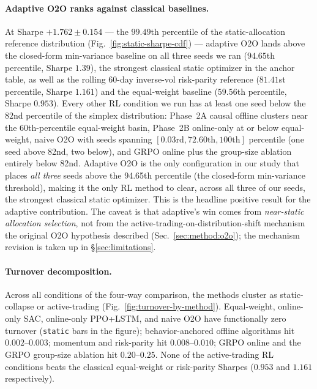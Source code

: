 \paragraph{Adaptive O2O ranks against classical baselines.} At Sharpe
$+1.762 \pm 0.154$ --- the $99.49$th percentile of the static-allocation
reference distribution (Fig.~\ref{fig:static-sharpe-cdf}) --- adaptive
O2O lands above the closed-form min-variance baseline on all three
seeds we ran ($94.65$th percentile, Sharpe $1.39$), the strongest classical static
optimizer in the anchor table, as well as the rolling 60-day
inverse-vol risk-parity reference ($81.41$st percentile, Sharpe $1.161$)
and the equal-weight baseline ($59.56$th percentile, Sharpe $0.953$).
Every other RL condition we run has at least one seed below the
$82$nd percentile of the simplex distribution: Phase~2A causal offline
clusters near the 60th-percentile equal-weight basin, Phase~2B
online-only at or below equal-weight, naive O2O with seeds spanning
$[0.03\text{rd}, 72.60\text{th}, 100\text{th}]$ percentile (one seed
above 82nd, two below), and GRPO online plus the group-size ablation
entirely below 82nd. Adaptive O2O is the only configuration in our
study that places \emph{all three} seeds above the 94.65th percentile
(the closed-form min-variance threshold), making it the only RL method
to clear, across all three of our seeds, the strongest classical static optimizer. This is the headline positive result for the adaptive
contribution.
The caveat is that adaptive's win comes from \emph{near-static
allocation selection}, not from the active-trading-on-distribution-shift
mechanism the original O2O hypothesis described
(Sec.~\ref{sec:method:o2o}); the mechanism revision is taken up in
\S\ref{sec:limitations}.

\paragraph{Turnover decomposition.} Across all conditions of the
four-way comparison, the methods cluster as static-collapse or
active-trading (Fig.~\ref{fig:turnover-by-method}). Equal-weight,
online-only SAC, online-only PPO+LSTM, and naive O2O have functionally
zero turnover (\texttt{static} bars in the figure); behavior-anchored
offline algorithms hit $0.002$--$0.003$; momentum and risk-parity hit
$0.008$--$0.010$; GRPO online and the GRPO group-size ablation hit
$0.20$--$0.25$. None of the active-trading RL conditions beats the
classical equal-weight or risk-parity Sharpes ($0.953$ and $1.161$
respectively).


